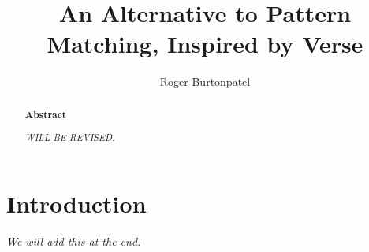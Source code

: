 \documentclass[manuscript,screen,review, 12pt]{acmart}
\begin{document}
\title{An Alternative to Pattern Matching, Inspired by Verse}

\author{Roger Burtonpatel}



\renewcommand{\shortauthors}{Burtonpatel et al.}

\begin{abstract}
    \bf{Abstract}

    \it{WILL BE REVISED.}
  


  \end{abstract}

\maketitle

\section{Introduction}
\it{We will add this at the end.}
\end{document}
